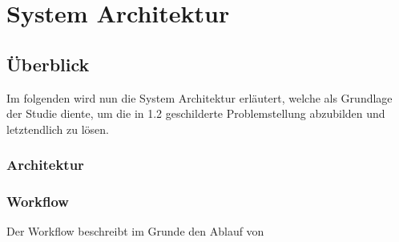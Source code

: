 \chapter{System Architektur}
\label{kap:Kapitel03}

\section{Überblick}

Im folgenden wird nun die System Architektur erläutert, welche als Grundlage der Studie diente, um die in 1.2 geschilderte Problemstellung abzubilden und letztendlich zu lösen. 

\subsection{Architektur}
\subsection{Workflow}
Der Workflow beschreibt im Grunde den Ablauf von 
